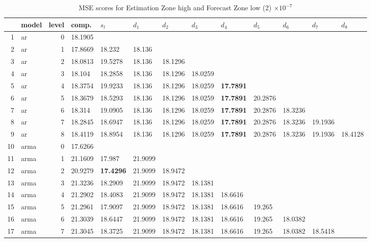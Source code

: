 \documentclass[10pt,a4paper]{article}
\begin{document}
\begin{table}[ht]
\centering
\caption{MSE scores for Estimation Zone high and Forecast Zone low (2) $ \times 10^{-7}$} 
\begin{tabular}{rlrllllllllll}
  \hline
 & model & level & comp. & $s_l$ & $d_1$ & $d_2$ & $d_3$ & $d_4$ & $d_5$ & $d_6$ & $d_7$ & $d_8$ \\ 
  \hline
1 & ar &     0 & 18.1905 &  &  &  &  &  &  &  &  &  \\ 
  2 & ar &     1 & 17.8669 & 18.232 & 18.136 &  &  &  &  &  &  &  \\ 
  3 & ar &     2 & 18.0813 & 19.5278 & 18.136 & 18.1296 &  &  &  &  &  &  \\ 
  4 & ar &     3 & 18.104 & 18.2858 & 18.136 & 18.1296 & 18.0259 &  &  &  &  &  \\ 
  5 & ar &     4 & 18.3754 & 19.9233 & 18.136 & 18.1296 & 18.0259 & \textbf{17.7891} &  &  &  &  \\ 
  6 & ar &     5 & 18.3679 & 18.5293 & 18.136 & 18.1296 & 18.0259 & \textbf{17.7891} & 20.2876 &  &  &  \\ 
  7 & ar &     6 & 18.314 & 19.0905 & 18.136 & 18.1296 & 18.0259 & \textbf{17.7891} & 20.2876 & 18.3236 &  &  \\ 
  8 & ar &     7 & 18.2845 & 18.6947 & 18.136 & 18.1296 & 18.0259 & \textbf{17.7891} & 20.2876 & 18.3236 & 19.1936 &  \\ 
  9 & ar &     8 & 18.4119 & 18.8954 & 18.136 & 18.1296 & 18.0259 & \textbf{17.7891} & 20.2876 & 18.3236 & 19.1936 & 18.4128 \\ 
   \hline
10 & arma &     0 & 17.6266 &  &  &  &  &  &  &  &  &  \\ 
  11 & arma &     1 & 21.1609 & 17.987 & 21.9099 &  &  &  &  &  &  &  \\ 
  12 & arma &     2 & 20.9279 & \textbf{17.4296} & 21.9099 & 18.9472 &  &  &  &  &  &  \\ 
  13 & arma &     3 & 21.3236 & 18.2909 & 21.9099 & 18.9472 & 18.1381 &  &  &  &  &  \\ 
  14 & arma &     4 & 21.2902 & 18.4083 & 21.9099 & 18.9472 & 18.1381 & 18.6616 &  &  &  &  \\ 
  15 & arma &     5 & 21.2961 & 17.9097 & 21.9099 & 18.9472 & 18.1381 & 18.6616 & 19.265 &  &  &  \\ 
  16 & arma &     6 & 21.3039 & 18.6447 & 21.9099 & 18.9472 & 18.1381 & 18.6616 & 19.265 & 18.0382 &  &  \\ 
  17 & arma &     7 & 21.3045 & 18.3725 & 21.9099 & 18.9472 & 18.1381 & 18.6616 & 19.265 & 18.0382 & 18.5418 &  \\ 

\end{tabular}
\end{table}
\end{document}
